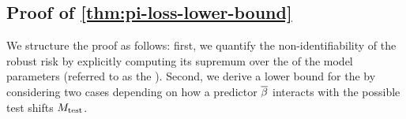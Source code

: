 \subsection{Proof of \cref{thm:pi-loss-lower-bound}}\label{sec:apx-proof-of-main-prop}

We structure the proof as follows: first, we quantify the non-identifiability of the robust risk by explicitly computing its supremum over the \idset of the model parameters (referred to as the \idRR). Second, we derive a lower bound for the \idRRs by considering two cases depending on how a predictor $\overline{\beta}$ interacts with the possible test shifts $M_{\mathrm{test}}$. 
